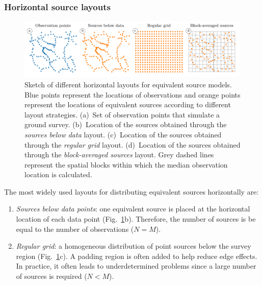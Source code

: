 \subsubsection{Horizontal source layouts}

\begin{figure}
    \includegraphics[width=\linewidth]{figs/source-layouts-schematics.pdf}
    \caption{
        Sketch of different horizontal layouts for equivalent source models.
        Blue points represent the locations of observations and orange points
        represent the locations of equivalent sources according to different
        layout strategies.
        (a)~Set of \SourceLayoutsSchematicsObservations{} observation points
        that simulate a ground survey.
        (b)~Location of the \SourceLayoutsSchematicsSourceBelowData{} sources
        obtained through the \emph{sources below data} layout.
        (c)~Location of the \SourceLayoutsSchematicsGridSources{} sources
        obtained through the \emph{regular grid} layout.
        (d)~Location of the \SourceLayoutsSchematicsBlockAveragedSources{}
        sources obtained through the \emph{block-averaged sources} layout.
        Grey dashed lines represent the spatial blocks within which the median
        observation location is calculated.
    }
    \label{fig:source_layouts}
\end{figure}

The most widely used layouts for distributing equivalent sources horizontally
are:

\begin{enumerate}
  \item
    \emph{Sources below data points}: one equivalent source is placed at the
    horizontal location of each data point (Fig.~\ref{fig:source_layouts}b).
    Therefore, the number of sources is be equal to the number of observations
    ($N=M$).
  \item
    \emph{Regular grid}: a homogeneous distribution of point sources below the
    survey region (Fig.~\ref{fig:source_layouts}c). A padding region is often
    added to help reduce edge effects. In practice, it often leads to
    underdetermined problems since a large number of sources is required
    ($N<M$).
\end{enumerate}

